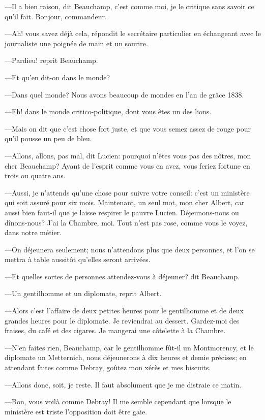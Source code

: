 —Il a bien raison, dit Beauchamp, c'est comme moi, je le critique sans savoir ce qu'il fait. Bonjour, commandeur. 

—Ah! vous savez déjà cela, répondit le secrétaire particulier en échangeant avec le journaliste une poignée de main et un sourire. 

—Pardieu! reprit Beauchamp. 

—Et qu'en dit-on dans le monde? 

—Dans quel monde? Nous avons beaucoup de mondes en l'an de grâce 1838. 

—Eh! dans le monde critico-politique, dont vous êtes un des lions. 

—Mais on dit que c'est chose fort juste, et que vous semez assez de rouge pour qu'il pousse un peu de bleu. 

—Allons, allons, pas mal, dit Lucien: pourquoi n'êtes vous pas des nôtres, mon cher Beauchamp? Ayant de l'esprit comme vous en avez, vous feriez fortune en trois ou quatre ans. 

—Aussi, je n'attends qu'une chose pour suivre votre conseil: c'est un ministère qui soit assuré pour six mois. Maintenant, un seul mot, mon cher Albert, car aussi bien faut-il que je laisse respirer le pauvre Lucien. Déjeunons-nous ou dînons-nous? J'ai la Chambre, moi. Tout n'est pas rose, comme vous le voyez, dans notre métier. 

—On déjeunera seulement; nous n'attendons plus que deux personnes, et l'on se mettra à table aussitôt qu'elles seront arrivées. 

—Et quelles sortes de personnes attendez-vous à déjeuner? dit Beauchamp. 

—Un gentilhomme et un diplomate, reprit Albert. 

—Alors c'est l'affaire de deux petites heures pour le gentilhomme et de deux grandes heures pour le diplomate. Je reviendrai au dessert. Gardez-moi des fraises, du café et des cigares. Je mangerai une côtelette à la Chambre. 

—N'en faites rien, Beauchamp, car le gentilhomme fût-il un Montmorency, et le diplomate un Metternich, nous déjeunerons à dix heures et demie précises; en attendant faites comme Debray, goûtez mon xérès et mes biscuits. 

—Allons donc, soit, je reste. Il faut absolument que je me distraie ce matin. 

—Bon, vous voilà comme Debray! Il me semble cependant que lorsque le ministère est triste l'opposition doit être gaie. 

